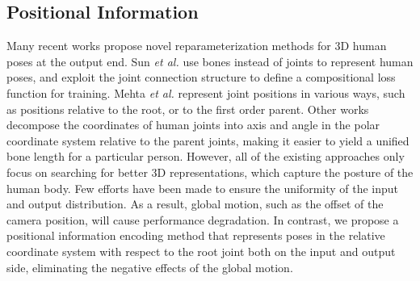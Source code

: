 \documentclass[sigconf]{acmart}
\begin{document}
\subsection{Positional Information}
Many recent works \cite{mehta2017monocular,sun2017compositional,li2020cascaded,xu2020deep,zhou2017towards,dabral2018learning} propose novel reparameterization methods for 3D human poses at the output end. Sun \textit{et al.} \cite{sun2017compositional} use bones instead of joints to represent human poses, and exploit the joint connection structure to define a compositional loss function for training. Mehta \textit{et al.} \cite{mehta2017monocular} represent joint positions in various ways, such as positions relative to the root, or to the first order parent. Other works \cite{li2020cascaded,xu2020deep} decompose the coordinates of human joints into axis and angle in the polar coordinate system relative to the parent joints, making it easier to yield a unified bone length for a particular person. However, all of the existing approaches only focus on searching for better 3D representations, which capture the posture of the human body. Few efforts have been made to ensure the uniformity of the input and output distribution. As a result, global motion, such as the offset of the camera position, will cause performance degradation. In contrast, we propose a positional information encoding method that represents poses in the relative coordinate system with respect to the root joint both on the input and output side, eliminating the negative effects of the global motion.
\end{document}
